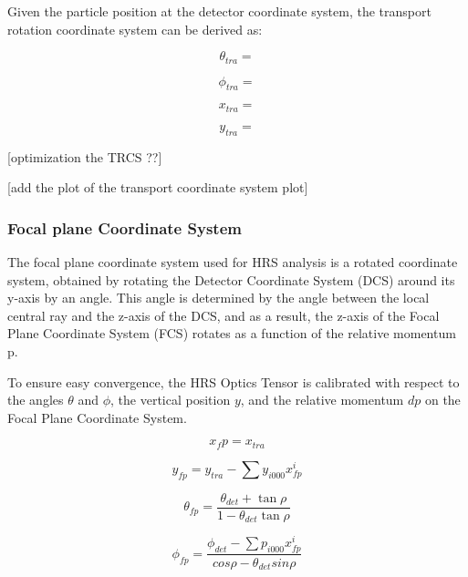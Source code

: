 Given the particle position at the detector coordinate system, the transport rotation coordinate system can be derived as:

\begin{equation}
    \theta_{tra}  = 
\end{equation}

\begin{equation}
    \phi_{tra} =
\end{equation}

\begin{equation}
    x_{tra} =
\end{equation}

\begin{equation}
    y_{tra} = 
\end{equation}


[optimization the TRCS ??]


[add the plot of the transport coordinate system plot]


\subsubsection{Focal plane Coordinate System}

The focal plane coordinate system used for HRS analysis is a rotated coordinate system, obtained by rotating the Detector Coordinate System (DCS) around its y-axis by an angle. This angle is determined by the angle between the local central ray and the z-axis of the DCS, and as a result, the z-axis of the Focal Plane Coordinate System (FCS) rotates as a function of the relative momentum p.

To ensure easy convergence, the HRS Optics Tensor is calibrated with respect to the angles $\theta$ and $\phi$, the vertical position $y$, and the relative momentum $dp$ on the Focal Plane Coordinate System.

\begin{equation}
    x_fp = x_{tra}    
\end{equation}

\begin{equation}
    y_{fp} = y_{tra} - \sum y_{i000}x^i_{fp}  
\end{equation}

\begin{equation}
\theta_{fp} = \frac{\theta_{det} + \tan\rho}{1 - \theta_{det}\tan\rho}
\end{equation}


\begin{equation}
    \phi_{fp} = \frac{\phi_{det} - \sum p_{i000}x^i_{fp}}{cos \rho - \theta_{det} sin\rho}
\end{equation}

